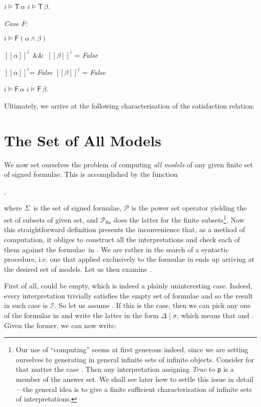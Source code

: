 \documentclass[a4paper,UKenglish]{lipics}
\newcounter{c}
\newcommand{\note}[1]{\textsl{#1}}
\newcommand{\cnst}[1]{\textsl{#1}}
\newcommand{\lett}[1]{\texttt{#1}}
\newcommand{\sg}[1]{\textsf{#1}}
\newcommand{\sftype}{\ensuremath{\Sigma}}
\newcommand{\band}{\ensuremath{\&\&}}
\newcommand{\interprt}{\ensuremath{\mathcal{I}}}
\newcommand{\vval}[2]{\ensuremath{[\![ #1]\!]^{#2}}}
\newcommand{\sat}[2]{\ensuremath{#1\models#2}}
\newcommand{\pow}{\ensuremath{\mathcal{P}}}
\newcommand{\finpow}{\ensuremath{\pow_\mathsf{fin}}}
\newcommand{\ssplit}[2]{\ensuremath{#1\!\mid\!#2}}
\begin{document}
\sat{i}{\sg{T}\,\alpha}  \sat{i}{\sg{T}\,\beta}.



\note{Case \sg{F}}:

\sat{i}{\sg{F}(\alpha\wedge\beta)} 


\vval{\alpha}{i}\ \band\ \vval{\beta}{i}  = \cnst{False}


\vval{\alpha}{i}= \cnst{False}  \vval{\beta}{i}  = \cnst{False}


\sat{i}{\sg{F}\,\alpha}  \sat{i}{\sg{F}\,\beta}.



\noindent Ultimately, we arrive at the following characterisation of the satisfaction relation:











\section{The Set of All Models}
We now set ourselves the problem of computing \emph{all models} of any given finite set  of signed formulae. This is accomplished by the function



,

\noindent where \sftype\ is the set of signed formulae, \pow{} is the power set operator yielding the set of subsets of given set, and \finpow{} 
does the latter for the finite subsets\footnote{Our use of ``computing'' seems at first generous indeed, since we are setting ourselves to generating in general infinite sets of infinite objects. Consider for that matter the case . Then any interpretation assigning \cnst{True} to \lett{p} is a member of the answer set. We shall see later how to settle this issue in detail ---the general idea is to give a finite sufficient characterisation of infinite sets of interpretations.}.
Now this straightforward definition presents the inconvenience that, as a method of computation, it obliges to construct all the interpretations and check each of them against the formulae\ in . We are rather in the search of a syntactic procedure, i.e. one that applied exclusively to the formulae in  ends up arriving at the desired set of models. Let us then examine .

First of all,  could be empty, which is indeed a plainly uninteresting case. Indeed, every interpretation trivially satisfies the empty set of formulae and so the result in such case is \interprt. So let us assume . If this is the case, then we can pick any one of the formulae  in  and write the latter in the form \ssplit{\Delta}{\sigma}, which means that 
 and 
. Given the former, we can now write:
\end{document}
